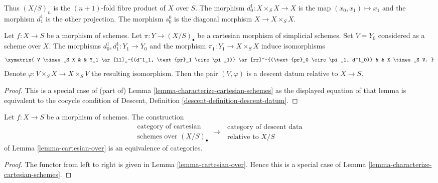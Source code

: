 \noindent
Thus $(X/S)_n$ is the $(n + 1)$-fold fibre product of $X$ over $S$.
The morphism $d^1_0 : X \times_S X \to X$ is the map
$(x_0, x_1) \mapsto x_1$ and the morphism $d^1_1$ is the other
projection. The morphism $s^0_0$ is the diagonal morphism
$X \to X \times_S X$.

\begin{lemma}
\label{lemma-cartesian-over}
Let $f : X \to S$ be a morphism of schemes.
Let $\pi : Y \to (X/S)_\bullet$ be a cartesian morphism
of simplicial schemes.
Set $V = Y_0$ considered as a scheme over $X$.
The morphisms $d^1_0, d^1_1 : Y_1 \to Y_0$ and the morphism
$\pi_1 : Y_1 \to X \times_S X$ induce isomorphisms
$$
\xymatrix{
V \times_S X & &
Y_1 \ar[ll]_-{(d^1_1, \text{pr}_1 \circ \pi_1)}
\ar[rr]^-{(\text{pr}_0 \circ \pi_1, d^1_0)} & &
X \times_S V.
}
$$
Denote $\varphi : V \times_S X \to X \times_S V$ the
resulting isomorphism.
Then the pair $(V, \varphi)$ is a descent datum relative
to $X \to S$.
\end{lemma}

\begin{proof}
This is a special case of (part of)
Lemma \ref{lemma-characterize-cartesian-schemes}
as the displayed equation of that lemma is
equivalent to the cocycle condition of
Descent, Definition \ref{descent-definition-descent-datum}.
\end{proof}

\begin{lemma}
\label{lemma-cartesian-equivalent-descent-datum}
Let $f : X \to S$ be a morphism of schemes. The construction
$$
\begin{matrix}
\text{category of cartesian } \\
\text{schemes over } (X/S)_\bullet
\end{matrix}
\longrightarrow
\begin{matrix}
\text{ category of descent data} \\
\text{ relative to } X/S
\end{matrix}
$$
of Lemma \ref{lemma-cartesian-over}
is an equivalence of categories.
\end{lemma}

\begin{proof}
The functor from left to right is given in
Lemma \ref{lemma-cartesian-over}.
Hence this is a special case of
Lemma \ref{lemma-characterize-cartesian-schemes}.
\end{proof}

